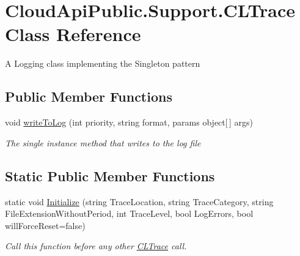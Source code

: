 \hypertarget{class_cloud_api_public_1_1_support_1_1_c_l_trace}{\section{Cloud\-Api\-Public.\-Support.\-C\-L\-Trace Class Reference}
\label{class_cloud_api_public_1_1_support_1_1_c_l_trace}
}


A Logging class implementing the Singleton pattern  


\subsection*{Public Member Functions}
\begin{DoxyCompactItemize}
\item 
void \hyperlink{class_cloud_api_public_1_1_support_1_1_c_l_trace_a48d83268eca0ea148c25094b3b343192}{write\-To\-Log} (int priority, string format, params object\mbox{[}$\,$\mbox{]} args)
\begin{DoxyCompactList}\small\item\em The single instance method that writes to the log file \end{DoxyCompactList}\end{DoxyCompactItemize}
\subsection*{Static Public Member Functions}
\begin{DoxyCompactItemize}
\item 
static void \hyperlink{class_cloud_api_public_1_1_support_1_1_c_l_trace_a5d7f8ca5bf5a4d75549d860fef87045b}{Initialize} (string Trace\-Location, string Trace\-Category, string File\-Extension\-Without\-Period, int Trace\-Level, bool Log\-Errors, bool will\-Force\-Reset=false)
\begin{DoxyCompactList}\small\item\em Call this function before any other \hyperlink{class_cloud_api_public_1_1_support_1_1_c_l_trace}{C\-L\-Trace} call. \end{DoxyCompactList}\end{DoxyCompactItemize}
